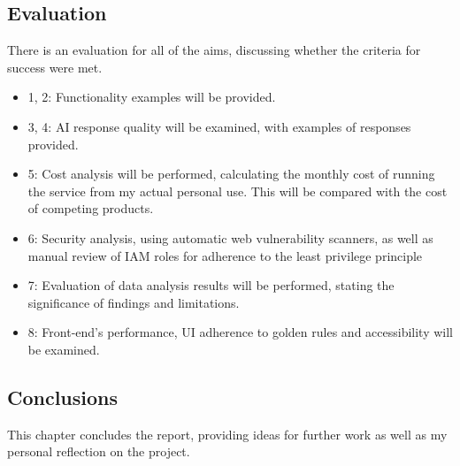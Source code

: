 \subsection{Evaluation}
There is an evaluation for all of the aims, discussing whether the criteria for success were met.
\begin{itemize}
    \item 1, 2: Functionality examples will be provided.
    \item 3, 4: AI response quality will be examined, with examples of responses provided. 
    \item 5: Cost analysis will be performed, calculating the monthly cost of running the service from my actual personal use. This will be compared with the cost of competing products.
    \item 6: Security analysis, using automatic web vulnerability scanners, as well as manual review of IAM roles for adherence to the least privilege principle
    \item 7: Evaluation of data analysis results will be performed, stating the significance of findings and limitations.
    \item 8: Front-end's performance, UI adherence to golden rules and accessibility will be examined.
\end{itemize}
\subsection{Conclusions}
This chapter concludes the report, providing ideas for further work as well as my personal reflection on the project.

